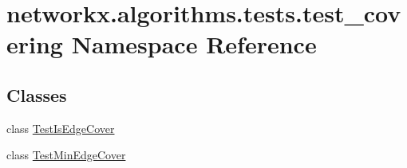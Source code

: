 \hypertarget{namespacenetworkx_1_1algorithms_1_1tests_1_1test__covering}{}\section{networkx.\+algorithms.\+tests.\+test\+\_\+covering Namespace Reference}
\label{namespacenetworkx_1_1algorithms_1_1tests_1_1test__covering}
\subsection*{Classes}
\begin{DoxyCompactItemize}
\item 
class \hyperlink{classnetworkx_1_1algorithms_1_1tests_1_1test__covering_1_1TestIsEdgeCover}{Test\+Is\+Edge\+Cover}
\item 
class \hyperlink{classnetworkx_1_1algorithms_1_1tests_1_1test__covering_1_1TestMinEdgeCover}{Test\+Min\+Edge\+Cover}
\end{DoxyCompactItemize}
